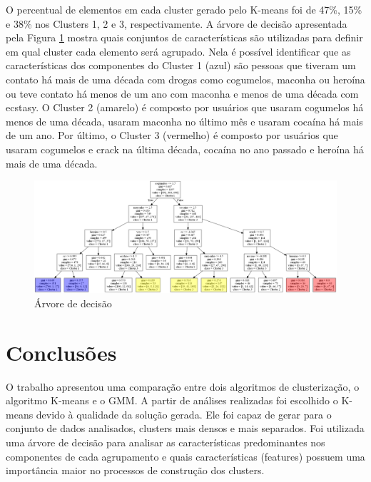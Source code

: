 \documentclass{article}
\begin{document}
O percentual de elementos em cada cluster gerado pelo K-means foi de 47\%, 15\% e 38\% nos Clusters 1, 2 e 3, respectivamente. A árvore de decisão apresentada pela Figura \ref{arvore} mostra quais conjuntos de características são utilizadas para definir em qual cluster cada elemento será agrupado. Nela é possível identificar que as características dos componentes do Cluster 1 (azul) são pessoas que tiveram um contato há mais de uma década com drogas como cogumelos, maconha ou heroína ou teve contato há menos de um ano com maconha e menos de uma década com ecstasy. O Cluster 2 (amarelo) é composto por usuários que usaram cogumelos há menos de uma década, usaram maconha no último mês e usaram cocaína há mais de um ano. Por último, o Cluster 3 (vermelho) é composto por usuários que usaram cogumelos e crack na última década, cocaína no ano passado e heroína há mais de uma década. 

\newpage
\begin{figure}[H]
\centering
    \includegraphics[scale=0.32, angle=270]{resultados/Arvore.pdf}
    \caption{Árvore de decisão}
\label{arvore}
\end{figure}
 
\section{Conclusões}
 
O trabalho apresentou uma comparação entre dois algoritmos de clusterização, o algoritmo K-means e o GMM. A partir de análises realizadas foi escolhido o K-means devido à qualidade da solução gerada. Ele foi capaz de gerar para o conjunto de dados analisados, clusters mais densos e mais separados. Foi utilizada uma árvore de decisão para analisar as características predominantes nos componentes de cada agrupamento e quais características (features) possuem uma importância maior no processos de construção dos clusters.



\end{document}
